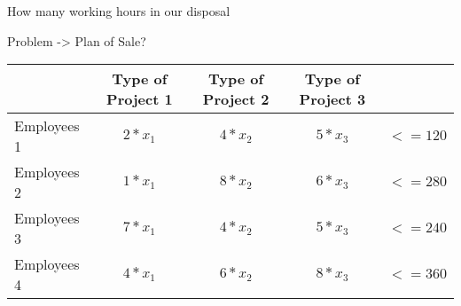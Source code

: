 \documentclass[a4paper,11pt]{scrartcl}
\begin{document}
\bigskip

How many working hours in our disposal

\bigskip

Problem -> Plan of Sale?

\bigskip


\begin{tabular}{|l |c| c| c| c| }
\hline
& Type of Project 1 &  Type of Project 2 &  Type of Project 3&  \\
\hline
Employees 1 & \begin{math} 2*x_1 \end{math} & \begin{math}4*x_2  \end{math} & \begin{math} 5*x_3 \end{math} & \begin{math}  <=120 \end{math} \\
\hline
Employees 2 & \begin{math} 1*x_1 \end{math} & \begin{math} 8*x_2 \end{math} & \begin{math} 6*x_3 \end{math}& \begin{math} <=280 \end{math} \\
\hline
Employees 3 & \begin{math} 7*x_1 \end{math} & \begin{math} 4*x_2  \end{math}& \begin{math} 5*x_3 \end{math}& \begin{math} <=240 \end{math} \\
\hline
Employees 4 & \begin{math}4*x_1 \end{math}  & \begin{math} 6*x_2 \end{math} & \begin{math} 8*x_3 \end{math}& \begin{math} <=360 \end{math}  \\
\hline



\end{tabular}
\end{document}
